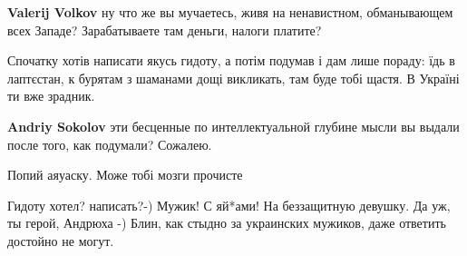 \begin{itemize}
\begin{itemize}
\begin{itemize}
\textbf{Valerij Volkov} ну что же вы мучаетесь, живя на ненавистном,
обманывающем всех Западе? Зарабатываете там деньги, налоги платите?

\end{itemize}

\end{itemize}

 
Спочатку хотів написати якусь гидоту, а потім подумав і дам лише пораду: їдь в
лаптєстан, к бурятам з шаманами дощі викликать, там буде тобі щастя. В Україні
ти вже зрадник.

\begin{itemize}
 
\textbf{Andriy Sokolov} эти бесценные по интеллектуальной глубине мысли вы выдали после того, как подумали? Сожалею.

 
Попий аяуаску.
Може тобі мозги прочисте

 
Гидоту хотел? написать?-) Мужик! С яй*ами! На беззащитную девушку. Да уж, ты герой, Андрюха -)
Блин, как стыдно за украинских мужиков, даже ответить достойно не могут.

 

\end{itemize}
\end{itemize}
